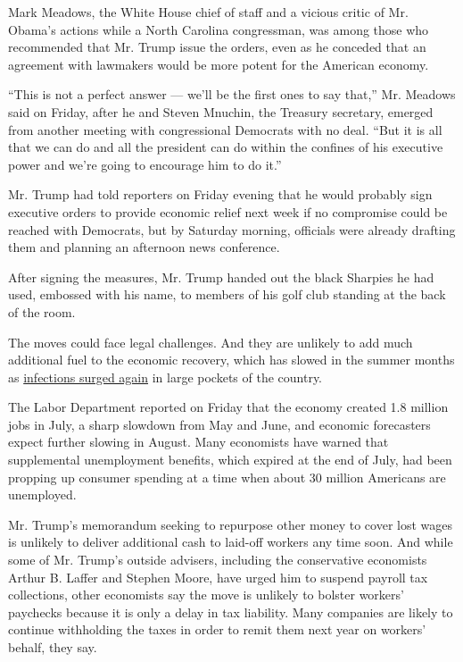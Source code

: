 Mark Meadows, the White House chief of staff and a vicious critic of Mr.
Obama's actions while a North Carolina congressman, was among those who
recommended that Mr. Trump issue the orders, even as he conceded that an
agreement with lawmakers would be more potent for the American economy.

``This is not a perfect answer --- we'll be the first ones to say
that,'' Mr. Meadows said on Friday, after he and Steven Mnuchin, the
Treasury secretary, emerged from another meeting with congressional
Democrats with no deal. ``But it is all that we can do and all the
president can do within the confines of his executive power and we're
going to encourage him to do it.''

Mr. Trump had told reporters on Friday evening that he would probably
sign executive orders to provide economic relief next week if no
compromise could be reached with Democrats, but by Saturday morning,
officials were already drafting them and planning an afternoon news
conference.

After signing the measures, Mr. Trump handed out the black Sharpies he
had used, embossed with his name, to members of his golf club standing
at the back of the room.

The moves could face legal challenges. And they are unlikely to add much
additional fuel to the economic recovery, which has slowed in the summer
months as
\href{https://www.nytimes.com/interactive/2020/us/coronavirus-us-cases.html}{infections
surged again} in large pockets of the country.

The Labor Department reported on Friday that the economy created 1.8
million jobs in July, a sharp slowdown from May and June, and economic
forecasters expect further slowing in August. Many economists have
warned that supplemental unemployment benefits, which expired at the end
of July, had been propping up consumer spending at a time when about 30
million Americans are unemployed.

Mr. Trump's memorandum seeking to repurpose other money to cover lost
wages is unlikely to deliver additional cash to laid-off workers any
time soon. And while some of Mr. Trump's outside advisers, including the
conservative economists Arthur B. Laffer and Stephen Moore, have urged
him to suspend payroll tax collections, other economists say the move is
unlikely to bolster workers' paychecks because it is only a delay in tax
liability. Many companies are likely to continue withholding the taxes
in order to remit them next year on workers' behalf, they say.

